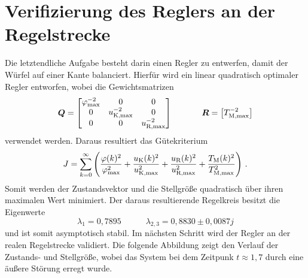 \section{Verifizierung des Reglers an der Regelstrecke}
Die letztendliche Aufgabe besteht darin einen Regler zu entwerfen, damit der Würfel auf einer Kante balanciert. Hierfür wird ein linear quadratisch optimaler Regler entworfen, wobei die Gewichtsmatrizen
\begin{equation}
\boldsymbol{Q} = \begin{bmatrix}
\varphi^{-2}_{\text{max}} & 0 & 0 \\
0 & u^{-2}_{\text{K,max}} & 0 \\
0 & 0 & u^{-2}_{\text{R,max}}
\end{bmatrix}
\hspace{35pt}
\boldsymbol{R} = \begin{bmatrix} T^{-2}_{\text{M,max}} \end{bmatrix}
\end{equation}
verwendet werden. Daraus resultiert das Gütekriterium
\begin{equation}
J = \sum^{\infty}_{k=0}\left( \frac{\varphi(k)^2}{\varphi^2_{\text{max}}} + \frac{u_{\text{K}}(k)^2}{u^2_{\text{K,max}}} + \frac{u_{\text{R}}(k)^2}{u^2_{\text{R,max}}} + \frac{T_{\text{M}}(k)^2}{T^2_{\text{M,max}}}\right)\,.
\end{equation}
Somit werden der Zustandsvektor und die Stellgröße quadratisch über ihren maximalen Wert minimiert. Der daraus resultierende Regelkreis besitzt die Eigenwerte
\begin{equation}
\lambda_1 = 0{,}7895 \hspace{35pt} \lambda_{2,3} = 0{,}8830 \pm 0{,}0087j
\end{equation}
und ist somit asymptotisch stabil. Im nächsten Schritt wird der Regler an der realen Regelstrecke validiert. Die folgende Abbildung zeigt den Verlauf der Zustands- und Stellgröße, wobei das System bei dem Zeitpunk $t\approx 1{,}7$ durch eine äußere Störung erregt wurde.
